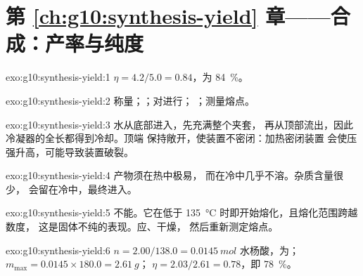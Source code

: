 \section*{第 \ref{ch:g10:synthesis-yield} 章——合成：产率与纯度}

\begin{solution}{exo:g10:synthesis-yield:1}
$\eta = 4.2 / 5.0 = 0.84$，为 \qty{84}{\percent}。
\end{solution}

\begin{solution}{exo:g10:synthesis-yield:2}
称量；；对进行；
；测量熔点。
\end{solution}

\begin{solution}{exo:g10:synthesis-yield:3}
水从底部进入，先充满整个夹套，
再从顶部流出，因此冷凝器的全长都得到冷却。顶端
保持敞开，使装置不密闭：加热密闭装置
会使压强升高，可能导致装置破裂。
\end{solution}

\begin{solution}{exo:g10:synthesis-yield:4}
产物须在热中极易，
而在冷中几乎不溶。杂质含量很少，
会留在冷中，最终进入。
\end{solution}

\begin{solution}{exo:g10:synthesis-yield:5}
不能。它在低于 \qty{135}{\celsius} 时即开始熔化，且熔化范围跨越数度，
这是固体不纯的表现。应、干燥，
然后重新测定熔点。
\end{solution}

\begin{solution}{exo:g10:synthesis-yield:6}
$n = 2.00 / 138.0 = \qty{0.0145}{mol}$ 水杨酸，为；$m_{\max} = 0.0145 \times 180.0 = \qty{2.61}{g}$；
$\eta = 2.03 / 2.61 = 0.78$，即 \qty{78}{\percent}。
\end{solution}

